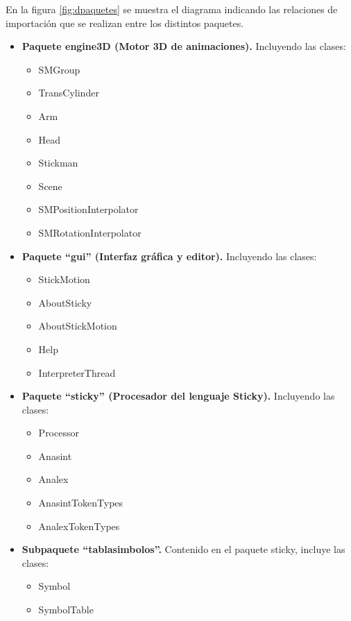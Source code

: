\documentclass[11pt,a4paper]{report}
\begin{document}
En la figura \ref{fig:dpaquetes} se muestra el diagrama indicando las relaciones de importación que se realizan entre los distintos paquetes. \\


\begin{itemize}
\item \textbf{Paquete engine3D (Motor 3D de animaciones).} Incluyendo las clases:

\begin{itemize}
\item SMGroup
\item TransCylinder
\item Arm
\item Head
\item Stickman
\item Scene
\item SMPositionInterpolator
\item SMRotationInterpolator
\end{itemize}

\item \textbf{Paquete ``gui'' (Interfaz gráfica y editor).} Incluyendo las clases:

\begin{itemize}
\item StickMotion
\item AboutSticky
\item AboutStickMotion
\item Help
\item InterpreterThread
\end{itemize}

\item \textbf{Paquete ``sticky'' (Procesador del lenguaje Sticky).} Incluyendo las clases:

\begin{itemize}
\item Processor
\item Anasint
\item Analex
\item AnasintTokenTypes
\item AnalexTokenTypes
\end{itemize}

\item \textbf{Subpaquete ``tablasimbolos''.} Contenido en el paquete sticky, incluye las clases:

\begin{itemize}
\item Symbol
\item SymbolTable
\end{itemize}

\end{itemize}
\end{document}

